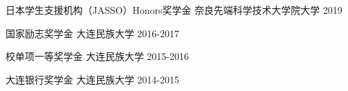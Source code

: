 




\begin{cvhonors}





    
  \cvhonor
    {日本学生支援机构（JASSO）Honors奖学金} %
    {奈良先端科学技术大学院大学} 
    {}%
    {2019} %
    
  \cvhonor
    {国家励志奖学金} %
    {大连民族大学} 
    {}%
    {2016-2017} %
    
    \cvhonor
    {校单项一等奖学金} %
    {大连民族大学} 
    {}%
    {2015-2016} %
    
  \cvhonor
    {大连银行奖学金} %
    {大连民族大学} 
    {}%
    {2014-2015} %
    


    
    
    
\end{cvhonors}




